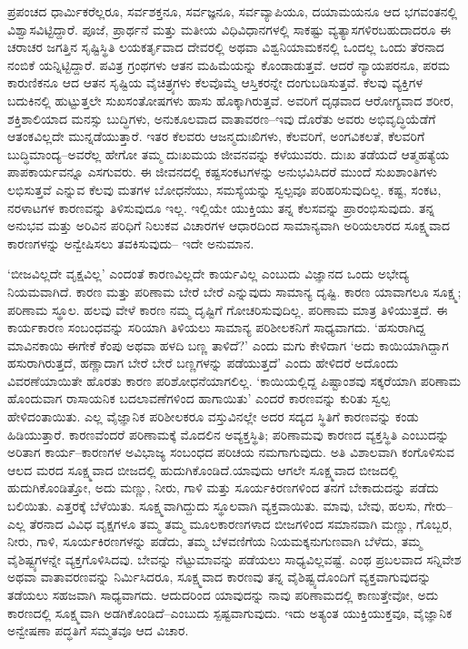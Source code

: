 ಪ್ರಪಂಚದ ಧಾರ್ಮಿಕರೆಲ್ಲರೂ, ಸರ್ವಶಕ್ತನೂ, ಸರ್ವಜ್ಞನೂ, ಸರ್ವವ್ಯಾಪಿಯೂ, ದಯಾ\-ಮಯನೂ ಆದ ಭಗವಂತನಲ್ಲಿ ವಿಶ್ವಾಸವಿಟ್ಟಿದ್ದಾರೆ. ಪೂಜೆ, ಪ್ರಾರ್ಥನೆ ಮತ್ತು ಮತೀಯ ವಿಧಿವಿಧಾನಗಳಲ್ಲಿ ಸಾಕಷ್ಟು ವ್ಯತ್ಯಾಸಗಳಿರಬಹುದಾದರೂ ಈ ಚರಾಚರ ಜಗತ್ತಿನ ಸೃಷ್ಟಿಸ್ಥಿತಿ ಲಯಕರ್ತೃವಾದ ದೇವರಲ್ಲಿ ಅಥವಾ ವಿಶ್ವನಿಯಾಮಕನಲ್ಲಿ ಒಂದಲ್ಲ ಒಂದು ತೆರನಾದ ನಂಬಿಕೆ ಯನ್ನಿಟ್ಟಿದ್ದಾರೆ. ಪವಿತ್ರ ಗ್ರಂಥಗಳು ಆತನ ಮಹಿಮೆಯನ್ನು ಕೊಂಡಾಡುತ್ತವೆ. ಆದರೆ ನ್ಯಾಯ\-ಪರನೂ, ಪರಮ ಕಾರುಣಿಕನೂ ಆದ ಆತನ ಸೃಷ್ಟಿಯ ವೈಚಿತ್ರ್ಯಗಳು ಕೆಲವೊಮ್ಮೆ ಆಸ್ತಿಕರನ್ನೇ ದಂಗುಬಡಿಸುತ್ತವೆ. ಕೆಲವು ವ್ಯಕ್ತಿಗಳ ಬದುಕಿನಲ್ಲಿ ಹುಟ್ಟುತ್ತಲೇ ಸುಖಸಂತೋಷಗಳು ಹಾಸು ಹೊಕ್ಕಾಗಿರುತ್ತವೆ. ಅವರಿಗೆ ದೃಢವಾದ ಆರೋಗ್ಯವಾದ ಶರೀರ, ಶಕ್ತಿಶಾಲಿಯಾದ ಮನಸ್ಸು ಬುದ್ಧಿಗಳು, ಅನುಕೂಲವಾದ ವಾತಾವರಣ–ಇವು ದೊರೆತು ಅವರು ಅಭಿವೃದ್ಧಿಯೆಡೆಗೆ ಆತಂಕವಿಲ್ಲದೇ ಮುನ್ನಡೆಯುತ್ತಾರೆ. ಇತರ ಕೆಲವರು ಆಜನ್ಮದುಃಖಿಗಳು, ಕೆಲವರಿಗೆ, ಅಂಗವಿಕಲತೆ, ಕೆಲವರಿಗೆ ಬುದ್ಧಿಮಾಂದ್ಯ–ಅವರೆಲ್ಲ ಹೇಗೋ ತಮ್ಮ ದುಃಖಮಯ ಜೀವನವನ್ನು ಕಳೆಯುವರು. ದುಃಖ ತಡೆಯದೆ ಆತ್ಮಹತ್ಯೆಯ ಪಾಪಕಾರ್ಯವನ್ನೂ ಎಸಗುವರು. ಈ ಜೀವನದಲ್ಲಿ ಕಷ್ಟಸಂಕಟಗಳನ್ನು ಅನುಭವಿಸಿದರೆ ಮುಂದೆ ಸುಖಶಾಂತಿಗಳು ಲಭಿಸುತ್ತವೆ ಎನ್ನುವ ಕೆಲವು ಮತಗಳ ಬೋಧನೆಯು, ಸಮಸ್ಯೆಯನ್ನು ಸ್ವಲ್ಪವೂ ಪರಿಹರಿಸುವುದಿಲ್ಲ. ಕಷ್ಟ, ಸಂಕಟ, ನರಳಾಟಗಳ ಕಾರಣವನ್ನು ತಿಳಿಸು\-ವುದೂ ಇಲ್ಲ. ಇಲ್ಲಿಯೇ ಯುಕ್ತಿಯು ತನ್ನ ಕೆಲಸವನ್ನು ಪ್ರಾರಂಭಿಸುವುದು. ತನ್ನ ಅನುಭವ ಮತ್ತು ಅರಿವಿನ ಪರಿಧಿಗೆ ನಿಲುಕವ ವಿಚಾರಗಳ ಆಧಾರದಿಂದ ಸಾಮಾನ್ಯವಾಗಿ ಅರಿಯಲಾರದ ಸೂಕ್ಷ್ಮವಾದ ಕಾರಣಗಳನ್ನು ಅನ್ವೇಷಿಸಲು ತವಕಿಸುವುದು– ಇದೇ ಅನುಮಾನ.

‘ಬೀಜವಿಲ್ಲದೇ ವೃಕ್ಷವಿಲ್ಲ’ ಎಂದಂತೆ ಕಾರಣವಿಲ್ಲದೇ ಕಾರ್ಯವಿಲ್ಲ ಎಂಬುದು ವಿಜ್ಞಾನದ ಒಂದು ಅಭೇದ್ಯ ನಿಯಮವಾಗಿದೆ. ಕಾರಣ ಮತ್ತು ಪರಿಣಾಮ ಬೇರೆ ಬೇರೆ ಎನ್ನುವುದು ಸಾಮಾನ್ಯ ದೃಷ್ಟಿ. ಕಾರಣ ಯಾವಾಗಲೂ ಸೂಕ್ಷ್ಮ; ಪರಿಣಾಮ ಸ್ಥೂಲ. ಹಲವು ವೇಳೆ ಕಾರಣ ನಮ್ಮ ದೃಷ್ಟಿಗೆ ಗೋಚರಿಸುವುದಿಲ್ಲ. ಪರಿಣಾಮ ಮಾತ್ರ ತಿಳಿಯುತ್ತದೆ. ಈ ಕಾರ್ಯಕಾರಣ ಸಂಬಂಧವನ್ನು ಸರಿಯಾಗಿ ತಿಳಿಯಲು ಸಾಮಾನ್ಯ ಪರಿಶೀಲಕನಿಗೆ ಸಾಧ್ಯವಾಗದು. ‘ಹಸುರಾಗಿದ್ದ ಮಾವಿನಕಾಯಿ ಈಗೇಕೆ ಕೆಂಪು ಅಥವಾ ಹಳದಿ ಬಣ್ಣ ತಾಳಿದೆ?’ ಎಂದು ಮಗು ಕೇಳಿದಾಗ ‘ಅದು ಕಾಯಿಯಾಗಿದ್ದಾಗ ಹಸುರಾಗಿರುತ್ತದೆ, ಹಣ್ಣಾದಾಗ ಬೇರೆ ಬೇರೆ ಬಣ್ಣಗಳನ್ನು ಪಡೆಯುತ್ತದೆ’ ಎಂದು ಹೇಳಿದರೆ ಅದೊಂದು ವಿವರಣೆಯಾಯಿತೇ ಹೊರತು ಕಾರಣ ಪರಿಶೋಧನೆಯಾಗಲಿಲ್ಲ. ‘ಕಾಯಿಯಲ್ಲಿದ್ದ ಪಿಷ್ಟಾಂಶವು ಸಕ್ಕರೆಯಾಗಿ ಪರಿಣಾಮ ಹೊಂದುವಾಗ ರಾಸಾಯನಿಕ ಬದಲಾವಣೆಗಳಿಂದ ಹಾಗಾಯಿತು’ ಎಂದರೆ ಕಾರಣವನ್ನು ಕುರಿತು ಸ್ವಲ್ಪ ಹೇಳಿದಂತಾಯಿತು. ಎಲ್ಲ ವೈಜ್ಞಾನಿಕ ಪರಿಶೀಲಕರೂ ವಸ್ತುವಿನಲ್ಲೇ ಅದರ ಸದ್ಯದ ಸ್ಥಿತಿಗೆ ಕಾರಣವನ್ನು ಕಂಡು ಹಿಡಿಯುತ್ತಾರೆ. ಕಾರಣವೆಂದರೆ ಪರಿಣಾಮಕ್ಕೆ ಮೊದಲಿನ ಅವ್ಯಕ್ತಸ್ಥಿತಿ; ಪರಿಣಾಮವು ಕಾರಣದ ವ್ಯಕ್ತಸ್ಥಿತಿ ಎಂಬುದನ್ನು ಅರಿತಾಗ ಕಾರ್ಯ–ಕಾರಣಗಳ ಅವಿಭಾಜ್ಯ ಸಂಬಂಧದ ಪರಿಚಯ ನಮಗಾಗುವುದು. ಅತಿ ವಿಶಾಲವಾಗಿ ಕಂಗೊಳಿಸುವ ಆಲದ ಮರದ ಸೂಕ್ಷ್ಮವಾದ ಬೀಜದಲ್ಲಿ ಹುದುಗಿಕೊಂಡಿದೆ.\break ಯಾವುದು ಆಗಲೇ ಸೂಕ್ಷ್ಮವಾದ ಬೀಜದಲ್ಲಿ ಹುದುಗಿಕೊಂಡಿತ್ತೋ, ಅದು ಮಣ್ಣು, ನೀರು, ಗಾಳಿ ಮತ್ತು ಸೂರ್ಯಕಿರಣಗಳಿಂದ ತನಗೆ ಬೇಕಾದುದನ್ನು ಪಡೆದು ಬಲಿಯಿತು. ಎತ್ತರಕ್ಕೆ ಬೆಳೆಯಿತು. ಸೂಕ್ಷ್ಮವಾಗಿದ್ದುದು ಸ್ಥೂಲವಾಗಿ ವ್ಯಕ್ತವಾಯಿತು. ಮಾವು, ಬೇವು, ಹಲಸು, ಗೇರು–ಎಲ್ಲ ತೆರನಾದ ವಿವಿಧ ವೃಕ್ಷಗಳೂ ತಮ್ಮ ತಮ್ಮ ಮೂಲಕಾರಣಗಳಾದ ಬೀಜಗಳಿಂದ ಸಮಾನವಾಗಿ ಮಣ್ಣು, ಗೊಬ್ಬರ, ನೀರು, ಗಾಳಿ, ಸೂರ್ಯಕಿರಣಗಳನ್ನು ಪಡೆದು, ತಮ್ಮ ಬೆಳವಣಿಗೆಯ ನಿಯಮಕ್ಕನುಗುಣವಾಗಿ ಬೆಳೆದು, ತಮ್ಮ ವೈಶಿಷ್ಟ್ಯಗಳನ್ನೇ ವ್ಯಕ್ತಗೊಳಿಸಿದವು. ಬೇವನ್ನು ನೆಟ್ಟು\break ಮಾವನ್ನು ಪಡೆಯಲು ಸಾಧ್ಯವಿಲ್ಲವಷ್ಟೆ. ಎಂಥ ಪ್ರಬಲವಾದ ಸನ್ನಿವೇಶ ಅಥವಾ ವಾತಾವರಣವನ್ನು ನಿರ್ಮಿಸಿದರೂ, ಸೂಕ್ಷ್ಮವಾದ ಕಾರಣವು ತನ್ನ ವೈಶಿಷ್ಟ್ಯದೊಂದಿಗೆ ವ್ಯಕ್ತವಾಗುವುದನ್ನು ತಡೆಯಲು ಸಹಜವಾಗಿ ಸಾಧ್ಯವಾಗದು. ಆದುದರಿಂದ ಯಾವುದನ್ನು ನಾವು ಪರಿಣಾಮದಲ್ಲಿ ಕಾಣುತ್ತೇವೋ, ಅದು ಕಾರಣದಲ್ಲಿ ಸೂಕ್ಷ್ಮವಾಗಿ ಅಡಗಿಕೊಂಡಿದೆ–ಎಂಬುದು ಸ್ಪಷ್ಟವಾಗುವುದು. ಇದು ಅತ್ಯಂತ ಯುಕ್ತಿಯುಕ್ತವೂ, ವೈಜ್ಞಾನಿಕ ಅನ್ವೇಷಣಾ ಪದ್ಧತಿಗೆ ಸಮ್ಮತವೂ ಆದ ವಿಚಾರ.

